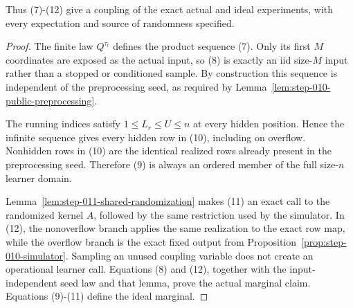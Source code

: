 \begin{lemma}
Thus (7)-(12) give a coupling of the exact actual and ideal experiments,
with every expectation and source of randomness specified.
\end{lemma}

\begin{proof}
The finite law \(Q^{\tau_t}\) defines the product sequence (7). Only its
first \(M\) coordinates are exposed as the actual input, so (8) is exactly
an iid size-\(M\) input rather than a stopped or conditioned sample. By
construction this sequence is independent of the preprocessing seed, as
required by Lemma~\ref{lem:step-010-public-preprocessing}.

The running indices satisfy \(1\le L_r\le U\le n\) at every hidden
position. Hence the infinite sequence gives every hidden row in (10),
including on overflow. Nonhidden rows in (10) are the identical realized
rows already present in the preprocessing seed. Therefore (9) is
always an ordered member of the full size-\(n\) learner domain.

Lemma~\ref{lem:step-011-shared-randomization} makes (11) an exact call to
the randomized kernel \(A\), followed by
the same restriction used by the simulator. In (12), the
nonoverflow branch applies the same realization to the exact row
map, while the overflow branch is the exact fixed output from Proposition~\ref{prop:step-010-simulator}. Sampling an unused coupling
variable does not create an operational learner call. Equations (8) and
(12), together with the input-independent seed law and that lemma, prove the
actual marginal claim. Equations (9)-(11) define the ideal marginal.
\end{proof}

